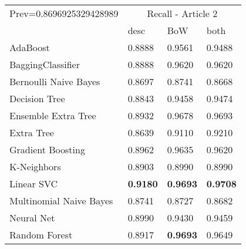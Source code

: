 \begin{tabular}{|l|l|l|l| }
\hline
Prev=0.8696925329428989 &  \multicolumn{3}{c|}{Recall - Article 2} \\
\cline{2-4} & desc & BoW & both \\ \hline
AdaBoost                & 0.8888 & 0.9561 & 0.9488\\
BaggingClassifier       & 0.8888 & 0.9620 & 0.9620\\
Bernoulli Naive Bayes   & 0.8697 & 0.8741 & 0.8668\\
Decision Tree           & 0.8843 & 0.9458 & 0.9474\\
Ensemble Extra Tree     & 0.8932 & 0.9678 & 0.9693\\
Extra Tree              & 0.8639 & 0.9110 & 0.9210\\
Gradient Boosting       & 0.8962 & 0.9635 & 0.9620\\
K-Neighbors             & 0.8903 & 0.8990 & 0.8990\\
Linear SVC              & {\bf 0.9180} & {\bf 0.9693} & {\bf 0.9708}\\
Multinomial Naive Bayes & 0.8741 & 0.8727 & 0.8682\\
Neural Net              & 0.8990 & 0.9430 & 0.9459\\
Random Forest           & 0.8917 & {\bf 0.9693} & 0.9649\\
\hline
\end{tabular}
